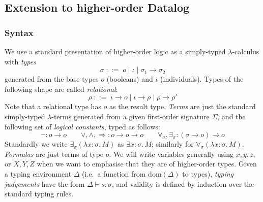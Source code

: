 
\newcommand{\abs}[2]{\lambda #1.\,{#2}}

\newcommand{\boolsort}{o}
\newcommand{\intsort}{\iota}
\newcommand{\mng}[1]{\llbracket #1 \rrbracket}
\newcommand{\mmng}[1]{\mathcal{M}\llbracket #1 \rrbracket}
\newcommand{\cmng}[1]{\mathcal{C}\llbracket #1 \rrbracket}
\newcommand{\smng}[1]{\mathcal{S}\llbracket #1 \rrbracket}
\newcommand{\makeset}[1]{\{#1\}}
\newcommand{\disjointTimesS}{\disjointTimes_S}
\newcommand{\superposeS}{{\superpose_S}}
\newcommand{\twistS}{\cplus_{\superpose_S}}
\newcommand{\lub}{\bigsqcup}
\newcommand{\truetm}{\mathsf{true}}
\newcommand{\falsetm}{\mathsf{false}}
\newcommand{\cTo}{\Rightarrow_{\rm c}}
\newcommand{\mTo}{\Rightarrow_{\rm m}}
\newcommand{\mexistsfn}{\mathsf{mexists}}
\newcommand{\mfunc}{T^\mathcal{M}}
\newcommand{\impliesfn}{\mathsf{implies}}

\newcommand{\andfn}{\mathsf{and}}
\newcommand{\mandfn}{\mathsf{mand}}
\newcommand{\andterm}{\mathsf{and}}
\newcommand{\orfn}{\mathsf{or}}
\newcommand{\morfn}{\mathsf{mor}}
\newcommand{\notfn}{\mathsf{not}}
\newcommand{\existsfn}{\mathsf{exists}}
\newcommand{\forallfn}{\mathsf{forall}}
\newcommand{\dom}{\mathrm{dom}}

\subsection{Extension to higher-order Datalog}


\subsubsection{Syntax} 
We use a standard presentation of higher-order logic as a simply-typed $\lambda$-calculus with \emph{types}
\[
\sigma \; ::= \; \boolsort \mid \intsort \mid \sigma_1 \to \sigma_2
\]
generated from the base types $\boolsort$ (booleans) and $\intsort$ (individuals).
Types of the following shape are called \emph{relational}:
\[
\rho \; ::= \; \intsort \to \boolsort \mid \intsort \to \rho \mid \rho \to \rho'
\]
Note that a relational type has $\boolsort$ as the result type.
\emph{Terms} are just the standard simply-typed $\lambda$-terms generated from a given first-order signature $\Sigma$, and the following set of \emph{logical constants}, typed as follows:
\[ \neg : \boolsort \to \boolsort \qquad \vee, \wedge, \Rightarrow : \boolsort \to \boolsort \to \boolsort \qquad \forall_\sigma, \exists_\sigma : (\sigma \to \boolsort) \to \boolsort\]
Standardly we write $\exists_\sigma(\abs{x\!\!:\!\!\sigma}{M})$ as $\exists x\!\!:\!\!\sigma .\, M$; similarly for $\forall_\sigma(\abs{x\!\!:\!\!\sigma}{M})$.
\emph{Formulas} are just terms of type $\boolsort$.
We will write variables generally using $x,y,z$, or $X,Y,Z$ when we want to emphasise that they are of higher-order types.
Given a typing environment $\Delta$ (i.e.~a function from $\dom(\Delta)$ to types), \emph{typing judgements} have the form $\Delta \vdash s : \sigma$, and validity is defined by induction over the standard typing rules.

